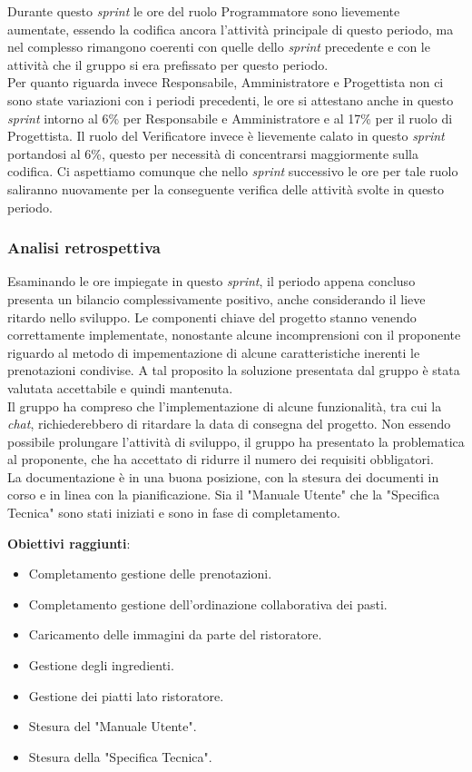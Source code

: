 Durante questo \textit{sprint} le ore del ruolo Programmatore sono lievemente aumentate, essendo la codifica ancora l'attività principale di questo periodo, ma nel complesso rimangono coerenti con quelle dello \textit{sprint} precedente e con le attività che il gruppo si era prefissato per questo periodo.\\ 
Per quanto riguarda invece Responsabile, Amministratore e Progettista non ci sono state variazioni con i periodi precedenti, le ore si attestano anche in questo \textit{sprint} intorno al 6\% per Responsabile e Amministratore e al 17\% per il ruolo di Progettista. 
Il ruolo del Verificatore invece è lievemente calato in questo \textit{sprint} portandosi al 6\%, questo per necessità di concentrarsi maggiormente sulla codifica. Ci aspettiamo comunque che nello \textit{sprint} successivo le ore per tale ruolo saliranno nuovamente per la conseguente verifica delle attività svolte in questo periodo.


\subsubsection{Analisi retrospettiva}
Esaminando le ore impiegate in questo \textit{sprint}, il periodo appena concluso presenta un bilancio complessivamente positivo, anche considerando il lieve ritardo nello sviluppo.
Le componenti chiave del progetto stanno venendo correttamente implementate, nonostante alcune incomprensioni con il proponente riguardo al metodo di impementazione di alcune caratteristiche inerenti le prenotazioni condivise.
A tal proposito la soluzione presentata dal gruppo è stata valutata accettabile e quindi mantenuta.\\
Il gruppo ha compreso che l'implementazione di alcune funzionalità, tra cui la \textit{chat}, richiederebbero di ritardare la data di consegna del progetto.
Non essendo possibile prolungare l'attività di sviluppo, il gruppo ha presentato la problematica al proponente, che ha accettato di ridurre il numero dei requisiti obbligatori. \\
La documentazione è in una buona posizione, con la stesura dei documenti in corso e in linea con la pianificazione. Sia il "Manuale Utente" che la "Specifica Tecnica" 
sono stati iniziati e sono in fase di completamento.

\textbf{Obiettivi raggiunti}:
\begin{itemize}
	\item Completamento gestione delle prenotazioni.
	\item Completamento gestione dell'ordinazione collaborativa dei pasti.
	\item Caricamento delle immagini da parte del ristoratore.
	\item Gestione degli ingredienti.
	\item Gestione dei piatti lato ristoratore.
	\item Stesura del "Manuale Utente".
	\item Stesura della "Specifica Tecnica".
\end{itemize}


